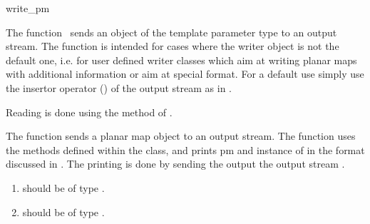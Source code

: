 
\ccRefPageBegin


\begin{ccRefFunction}{write_pm}


\ccDefinition

The function \ccRefName\ sends an object of the template parameter
type  to an output stream. The function is intended
for cases where the writer object is not the default one, i.e. for
user defined writer classes which aim at writing planar maps with
additional information or aim at special format. For a default use
simply use the insertor operator (\ccc{<<}) of the output stream as in
.

Reading is done using the  method of
.


           {The function sends a planar map object to an output
           stream. The function uses the methods defined within the
            class, and prints {pm} and instance of
            in the format discussed in
           .  The printing is done by sending
           the output the output stream .}

\begin{enumerate}
   \item    {}  
            should be of type .
   \item    {}  
            should be of type .
\end{enumerate}

\ccSeeAlso
     \\



\end{ccRefFunction} %

\ccRefPageEnd
